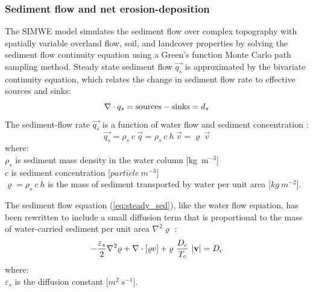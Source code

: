 \documentclass[gmd, manuscript]{copernicus}
\begin{document}

\subsubsection{Sediment flow and net erosion-deposition}

The SIMWE model simulates the sediment flow over complex topography 
with spatially variable overland flow, soil, and landcover properties 
by solving  the sediment flow continuity equation
using a Green's function Monte Carlo path sampling method.
Steady state sediment flow $\vec{q_s}$ is approximated by
the bivariate continuity equation, which relates 
the change in sediment flow rate to effective sources and sinks:
%
\begin{equation}
\label{eq:steady_sed}
\nabla\cdot \vec{q_s} = {\rm sources - sinks}= d_s
\end{equation}
%
\noindent
The sediment-flow rate $\vec{q_s}$ is a function of water flow and sediment concentration
\citep{Mitas1998}: %
%
\begin{equation}
\label{eq:sedflow}
\vec{q_s} = \rho_s~c~\vec{q} = \rho_s~c~h~\vec{v} = \varrho~\vec{v}
\end{equation}
{\small
\noindent
where: \\
\hspace*{0.5em} $\rho_s$ is sediment mass density in the water column [\unit{kg~m}$^{-3}$]\\
\hspace*{0.5em} $c$ is sediment concentration [$\unit{particle~m^{-3}}$]\\
\hspace*{0.5em} $\varrho = \rho_s~c~h$ is the mass of sediment transported by water per unit area [$\unit{kg~m^{-2}}$]. 
}

The sediment flow equation (\ref{eq:steady_sed}),
like the water flow equation, 
has been rewritten to include a small diffusion term that is
proportional to the mass of water-carried sediment per unit area 
$\nabla^2 \varrho$ \citep{Mitas1998}:
\begin{equation}
\label{eq:difsedim}
-{\varepsilon_s \over 2}\nabla^2 \varrho
+ \nabla\cdot [\varrho \vec{v}]
 + \varrho~{D_c \over T_c}~|{\bf v}|
= D_c
\end{equation}
{\small
\noindent
where:\\
\noindent
\hspace*{0.5em} $\varepsilon_s$ is the diffusion constant [$\unit{m^2~s^{-1}}$].\\
}
\end{document}
